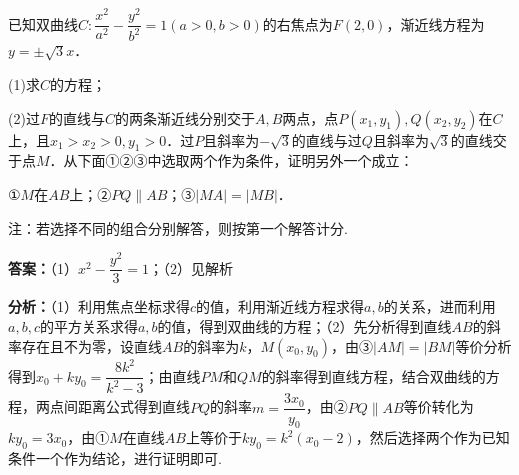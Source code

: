 \begin{question}[points=12]
已知双曲线$C:\dfrac{x^2}{a^2}-\dfrac{y^2}{b^2}=1(a>0,b>0)$的右焦点为$F(2,0)$，渐近线方程为$y=\pm\sqrt{3}x$．

(1)求$C$的方程；

(2)过$F$的直线与$C$的两条渐近线分别交于$A,B$两点，点$P(x_1,y_1),Q(x_2,y_2)$在$C$上，且$x_1>x_2>0,y_1>0$．过$P$且斜率为$-\sqrt{3}$的直线与过$Q$且斜率为$\sqrt{3}$的直线交于点$M$．从下面①②③中选取两个作为条件，证明另外一个成立：

①$M$在$AB$上；②$PQ\parallel AB$；③$|MA|=|MB|$．

注：若选择不同的组合分别解答，则按第一个解答计分.
\begin{solution}
\textbf{答案：}（1）$x^2-\dfrac{y^2}{3}=1$；（2）见解析

\textbf{分析：}（1）利用焦点坐标求得$c$的值，利用渐近线方程求得$a,b$的关系，进而利用$a,b,c$的平方关系求得$a,b$的值，得到双曲线的方程；（2）先分析得到直线$AB$的斜率存在且不为零，设直线$AB$的斜率为$k$，$M(x_0,y_0)$，由③$|AM|=|BM|$等价分析得到$x_0+ky_0=\dfrac{8k^2}{k^2-3}$；由直线$PM$和$QM$的斜率得到直线方程，结合双曲线的方程，两点间距离公式得到直线$PQ$的斜率$m=\dfrac{3x_0}{y_0}$，由②$PQ\parallel AB$等价转化为$ky_0=3x_0$，由①$M$在直线$AB$上等价于$ky_0=k^2(x_0-2)$，然后选择两个作为已知条件一个作为结论，进行证明即可.


\end{solution}
\end{question}
